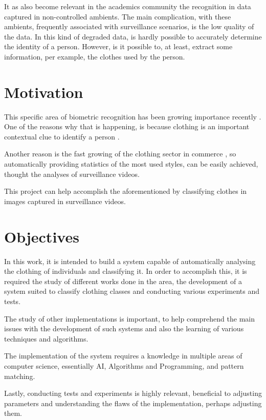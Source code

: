 \documentclass[titlepage,12pt,a4paper,times]{book}
\begin{document}
It as also become relevant in the academics community the recognition in data
captured in non-controlled ambients. The main complication, with these
ambients, frequently associated with surveillance scenarios, is the low quality
of the data. In this kind of degraded data, is hardly possible to accurately
determine the identity of a person. However, is it possible to, at least,
extract some information, per example, the clothes used by the person.

\section{Motivation}
\label{sec:mot}

This specific area of biometric recognition has been growing importance
recently \citep{1, 4}. One of the reasons why that is happening, is because
clothing is an important contextual clue to identify a person \citep{2, 13}.

Another reason is the fast growing of the clothing sector in commerce
\citep{5}, so automatically providing statistics of the most used styles, can
be easily achieved, thought the analyses of surveillance videos.

This project can help accomplish the aforementioned by classifying clothes in
images captured in surveillance videos.

\section{Objectives}
\label{sec:obj}

In this work, it is intended to build a system capable of automatically
analysing the clothing of individuals and classifying it. In order to
accomplish this, it is required the study of different works done in the area,
the development of a system suited to classify clothing classes and conducting
various experiments and tests.

The study of other implementations is important, to help comprehend the main
issues with the development of such systems and also the learning of various
techniques and algorithms.

The implementation of the system requires a knowledge in multiple areas of
computer science, essentially \ac{AI}, Algorithms and Programming, and pattern
matching.

Lastly, conducting tests and experiments is highly relevant, beneficial to
adjusting parameters and understanding the flaws of the implementation, perhaps
adjusting them.
\end{document}
